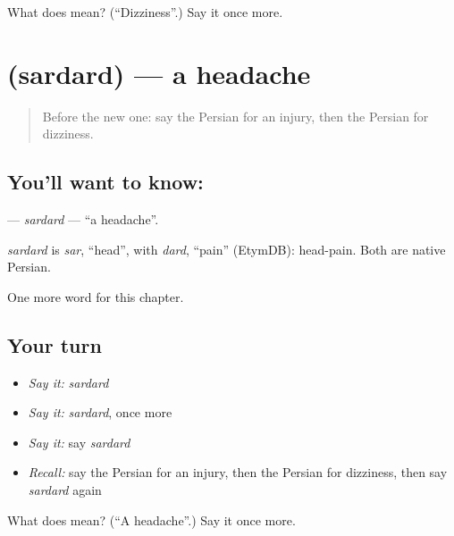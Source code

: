 \begin{tcolorbox}[breakable,colback=teal!4,colframe=teal!35!black,title={Before you move on}]
What does  mean? (\textquotedblleft{}Dizziness\textquotedblright{}.) Say it once more.
\end{tcolorbox}
\section[\texorpdfstring{\fa{سردرد} (sardard)}{سردرد (sardard)}]{ (sardard) — a headache}

\label{lesson:FA-C263-sardard}



\begin{quote}
Before the new one: say the Persian for an injury, then the Persian for dizziness.
\end{quote}

\subsection*{You'll want to know: }
\textbf{} — \emph{sardard} — \textquotedblleft{}a headache\textquotedblright{}.

\begin{cousinweb}
\emph{sardard} is \emph{sar}, \textquotedblleft{}head\textquotedblright{}, with \emph{dard}, \textquotedblleft{}pain\textquotedblright{} (EtymDB): head-pain. Both are native Persian.
\end{cousinweb}

\begin{grammarlens}[title={What you've built}]
One more word for this chapter.
\end{grammarlens}

\subsection*{Your turn}
\begin{itemize}
\raggedright
  \item \emph{Say it:} \emph{sardard}
  \item \emph{Say it:} \emph{sardard}, once more
  \item \emph{Say it:} say \emph{sardard}
  \item \emph{Recall:} say the Persian for an injury, then the Persian for dizziness, then say \emph{sardard} again
\end{itemize}

\begin{tcolorbox}[breakable,colback=teal!4,colframe=teal!35!black,title={Before you move on}]
What does  mean? (\textquotedblleft{}A headache\textquotedblright{}.) Say it once more.
\end{tcolorbox}
